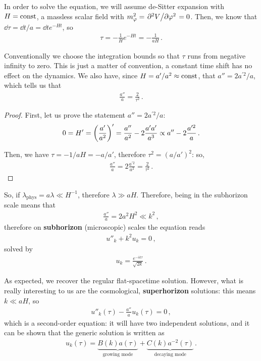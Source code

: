 \documentclass[main.tex]{subfiles}
\begin{document}
In order to solve the equation, we will assume de-Sitter expansion with \(H = \text{const}\), a massless scalar field with \(m_\varphi^2 = \pdv*[2]{V}{\varphi } = 0\). 
Then, we know that \(\dd{\tau } = \dd{t} / a = \dd{t} e^{-Ht}\), so 
%
\begin{align}
\tau = - \frac{1}{H} e^{-Ht} = - \frac{1}{aH}
\,.
\end{align}

Conventionally we choose the integration bounds so that \(\tau \) runs from negative infinity to zero. This is just a matter of convention, a constant time shift has no effect on the dynamics.
We also have, since \(H = a' / a^2 \approx \text{const}\), that \(a'' = 2 a^{\prime 2} / a\), which tells us that
%
\begin{align}
\frac{a''}{a} = \frac{2}{\tau^2}
\,.
\end{align}

\begin{proof}
First, let us prove the statement \(a'' = 2 a^{\prime 2} / a\): 
%
\begin{align}
0 = H' = \qty( \frac{a'}{a^2})' = \frac{a''}{a^2} - 2 \frac{a' a'}{a^3} 
\propto a'' - 2 \frac{a^{\prime 2}}{a}
\,.
\end{align}

Then, we have \(\tau = - 1 / aH = - a / a'\), therefore \(\tau^2 = (a / a')^2\): so, 
%
\begin{align}
\frac{a''}{a} = 2 \frac{a^{\prime 2}}{a^2} = \frac{2}{\tau^2}
\,.
\end{align}
\end{proof}

So, if \(\lambda _{\text{phys}} = a \lambda \ll H^{-1}\), therefore \(\lambda \gg aH\). Therefore, being in the subhorizon scale means that 
%
\begin{align}
\frac{a''}{a} = 2 a^2 H^2 \ll k^2
\,,
\end{align}
%
therefore on \textbf{subhorizon} (microscopic) scales the equation reads 
%
\begin{align}
u''_k + k^2 u_k = 0
\,,
\end{align}
%
solved by 
%
\begin{align}
u_k = \frac{e^{-ik \tau }}{\sqrt{2 k }}
\,.
\end{align}

As expected, we recover the regular flat-spacetime solution.
However, what is really interesting to us are the cosmological, \textbf{superhorizon} solutions: this means \(k \ll a H\), so 
%
\begin{align}
u''_k (\tau ) - \frac{a''}{a} u_k (\tau ) = 0
\,,
\end{align}
%
which is a second-order equation: it will have two independent solutions, and it can be shown that the generic solution is written as 
%
\begin{align}
u_k(\tau ) = \underbrace{B(k) a(\tau )}_{\text{growing mode}} + \underbrace{C(k) a^{-2}(\tau )}_{\text{decaying mode}}
\,.
\end{align}
\end{document}
